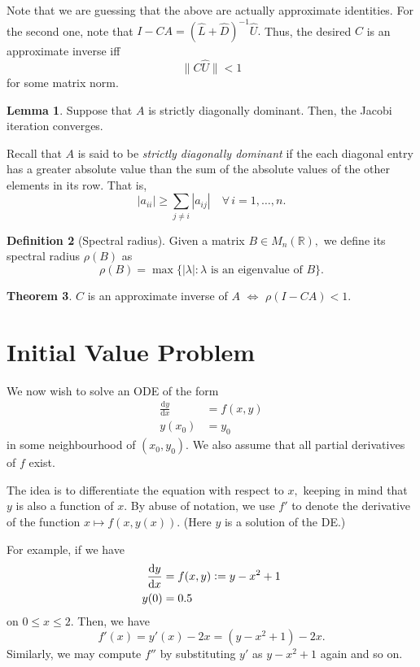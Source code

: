 \documentclass[12pt]{article}
\theoremstyle{definition}
\newtheorem{thm}{Theorem}
\newtheorem{lem}[thm]{Lemma}
\newtheorem{defn}[thm]{Definition}
\newcommand{\md}[1]{{\left\lvert #1 \right\lvert}}
\begin{document}
Note that we are guessing that the above are actually approximate identities. For the second one, note that $I - CA = (\hat{L} + \hat{D})^{-1}\hat{U}.$ Thus, the desired $C$ is an approximate inverse iff
\begin{equation*} 
	\|C\hat{U}\| < 1
\end{equation*}
for some matrix norm.

\begin{lem} 
	Suppose that $A$ is strictly diagonally dominant. Then, the Jacobi iteration converges.
\end{lem}
Recall that $A$ is said to be \emph{strictly diagonally dominant} if the each diagonal entry has a greater absolute value than the sum of the absolute values of the other elements in its row. That is,
\begin{equation*} 
	\md{a_{ii}} \ge \sum_{j \neq i}\md{a_{ij}} \quad \forall\, i = 1, \ldots, n.	
\end{equation*}

\begin{defn}[Spectral radius]
	Given a matrix $B \in M_n(\mathbb{R}),$ we define its spectral radius $\rho(B)$ as
	\begin{equation*} 
		\rho(B) = \max \{\md{\lambda} : \lambda \text{ is an eigenvalue of }B\}.
	\end{equation*}
\end{defn}

\begin{thm}
	$C$ is an approximate inverse of $A$ $\iff$ $\rho(I - CA) < 1.$
\end{thm}

\section{Initial Value Problem}
We now wish to solve an ODE of the form
\begin{align*} 
	\frac{{\mathrm d}y}{{\mathrm d}x} &= f(x, y)\\
	y(x_0) &= y_0
\end{align*}
in some neighbourhood of $(x_0, y_0).$ We also assume that all partial derivatives of $f$ exist.

The idea is to differentiate the equation with respect to $x,$ keeping in mind that $y$ is also a function of $x.$ By abuse of notation, we use $f'$ to denote the derivative of the function $x \mapsto f(x, y(x)).$ (Here $y$ is a solution of the DE.)

For example, if we have
\begin{align*} 
	\frac{{\mathrm d}y}{{\mathrm d}x} &= f(x, y) \vcentcolon= y - x^2 + 1\\
	y(0) &= 0.5
\end{align*}
on $0 \le x \le 2.$ Then, we have
\begin{equation*} 
	f'(x) = y'(x) - 2x = (y - x^2 + 1) - 2x.
\end{equation*}
Similarly, we may compute $f''$ by substituting $y'$ as $y - x^2 + 1$ again and so on.
\end{document}
